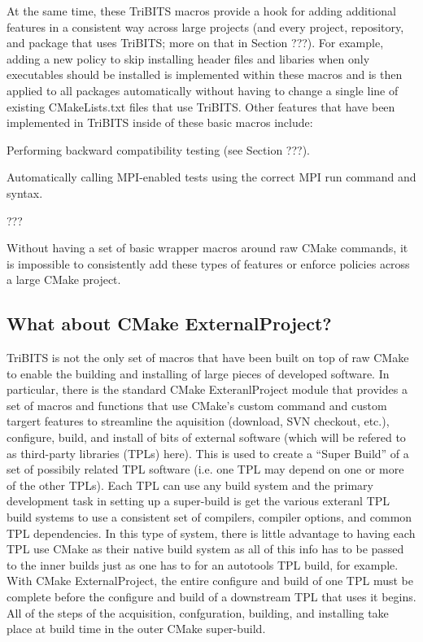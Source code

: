 \documentclass[note]{TechNote}
\begin{document}
At the same time, these TriBITS macros provide a hook for adding additional features in a consistent way across large projects (and every project, repository, and package that uses TriBITS; more on that in Section ???).  For example, adding a new policy to skip installing header files and libaries when only executables should be installed is implemented within these macros and is then applied to all packages automatically without having to change a single line of existing CMakeLists.txt files that use TriBITS.  Other features that have been implemented in TriBITS inside of these basic macros include:

\begin{compactitem}
\item Performing backward compatibility testing (see Section ???).
\item Automatically calling MPI-enabled tests using the correct MPI run command and syntax.
\item ???
\end{compactitem}

Without having a set of basic wrapper macros around raw CMake commands, it is impossible to consistently add these types of features or enforce policies across a large CMake project.

%
\subsection{What about CMake ExternalProject?}
\label{sec:what_about_cmake_externalproject}
%

TriBITS is not the only set of macros that have been built on top of raw CMake to enable the building and installing of large pieces of developed software.  In particular, there is the standard CMake ExteranlProject module that provides a set of macros and functions that use CMake's custom command and custom targert features to streamline the aquisition (download, SVN checkout, etc.), configure, build, and install of bits of external software (which will be refered to as third-party libraries (TPLs) here).  This is used to create a ``Super Build'' of a set of possibily related TPL software (i.e. one TPL may depend on one or more of the other TPLs).  Each TPL can use any build system and the primary development task in setting up a super-build is get the various exteranl TPL build systems to use a consistent set of compilers, compiler options, and common TPL dependencies.  In this type of system, there is little advantage to having each TPL use CMake as their native build system as all of this info has to be passed to the inner builds just as one has to for an autotools TPL build, for example.  With CMake ExternalProject, the entire configure and build of one TPL must be complete before the configure and build of a downstream TPL that uses it begins.  All of the steps of the acquisition, confguration, building, and installing take place at build time in the outer CMake super-build.
\end{document}
